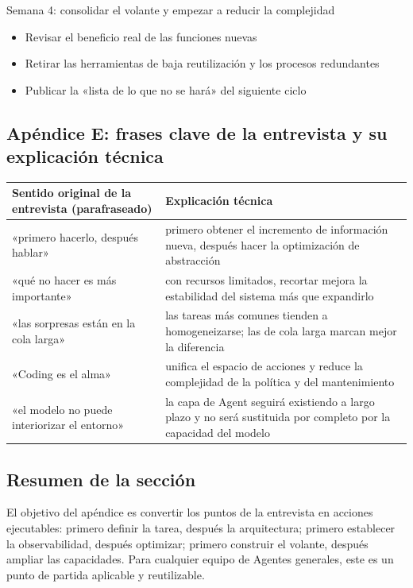 \documentclass[a4paper]{article}
\begin{document}
\begin{knowledgebox}{Semana 4: consolidar el volante y empezar a reducir la complejidad}
\begin{itemize}
    \item Revisar el beneficio real de las funciones nuevas
    \item Retirar las herramientas de baja reutilización y los procesos redundantes
    \item Publicar la «lista de lo que no se hará» del siguiente ciclo
\end{itemize}
\end{knowledgebox}

\subsection{Apéndice E: frases clave de la entrevista y su explicación técnica}

\begin{center}
\begin{tabular}{p{5.4cm}p{7.2cm}}
\toprule
Sentido original de la entrevista (parafraseado) & Explicación técnica \\
\midrule
«primero hacerlo, después hablar» & primero obtener el incremento de información nueva, después hacer la optimización de abstracción \\
«qué no hacer es más importante» & con recursos limitados, recortar mejora la estabilidad del sistema más que expandirlo \\
«las sorpresas están en la cola larga» & las tareas más comunes tienden a homogeneizarse; las de cola larga marcan mejor la diferencia \\
«Coding es el alma» & unifica el espacio de acciones y reduce la complejidad de la política y del mantenimiento \\
«el modelo no puede interiorizar el entorno» & la capa de Agent seguirá existiendo a largo plazo y no será sustituida por completo por la capacidad del modelo \\
\bottomrule
\end{tabular}
\end{center}

\subsection{Resumen de la sección}

El objetivo del apéndice es convertir los puntos de la entrevista en acciones ejecutables: primero definir la tarea, después la arquitectura; primero establecer la observabilidad, después optimizar; primero construir el volante, después ampliar las capacidades. Para cualquier equipo de Agentes generales, este es un punto de partida aplicable y reutilizable.
\end{document}
